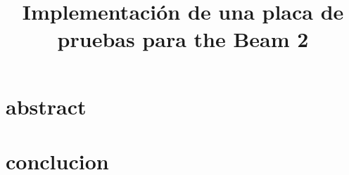 \documentclass[10pt,letterpaper,twocolumn]{report}
\title{Implementación de una placa de pruebas para the Beam 2}
\begin{document}
\maketitle
\section{abstract}
\section{conclucion}
\end{document}
